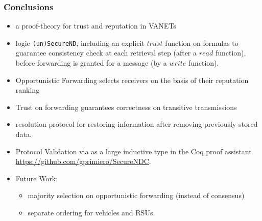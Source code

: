 \documentclass{beamer}
\begin{document}
\begin{frame}
\label{conclusions}
\frametitle{Conclusions}
\smallskip

\begin{itemize}
\item a proof-theory for trust and reputation in VANETs
\item logic \texttt{(un)SecureND}, including an explicit $trust$ function on formulas to guarantee consistency check at each retrieval step (after a $read$ function), before forwarding is granted for a message (by a $write$ function).
\item Opportunistic Forwarding selects receivers on the basis of their reputation ranking
\item Trust on forwarding guarantees correctness on transitive transmissions
\item resolution protocol for restoring information after removing previously stored data.
\item Protocol Validation via as a large inductive type in the Coq proof assistant \url{https://github.com/gprimiero/SecureNDC}.

\item Future Work:
\begin{itemize}
\item majority selection on opportunistic forwarding (instead of consensus)
\item separate ordering for vehicles and RSUs.
\end{itemize}
\end{itemize}
\end{frame}
\end{document}
